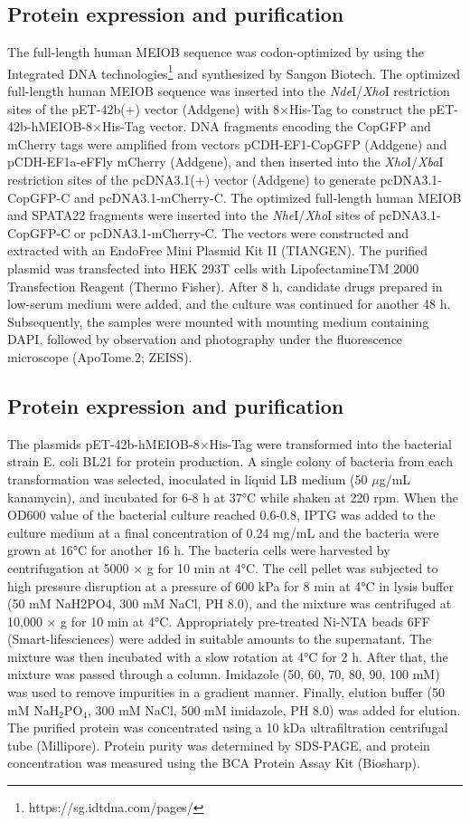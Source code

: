 \documentclass[unnumsec,webpdf,contemporary,large]{oup-authoring-template}%
\theoremstyle{thmstyleone}%
\theoremstyle{thmstyletwo}%
\theoremstyle{thmstylethree}%
\begin{document}
\subsection*{Protein expression and purification}
The full-length human MEIOB sequence was codon-optimized by using the Integrated DNA technologies\footnote{https://sg.idtdna.com/pages/} and synthesized by Sangon Biotech. The optimized full-length human MEIOB sequence was inserted into the \textit{Nde}I/\textit{Xho}I restriction sites of the pET-42b(+) vector (Addgene) with 8×His-Tag to construct the pET-42b-hMEIOB-8×His-Tag vector. DNA fragments encoding the CopGFP and mCherry tags were amplified from vectors pCDH-EF1-CopGFP (Addgene) and pCDH-EF1a-eFFly mCherry (Addgene), and then inserted into the \textit{Xho}I/\textit{Xba}I restriction sites of the pcDNA3.1(+) vector (Addgene) to generate pcDNA3.1-CopGFP-C and pcDNA3.1-mCherry-C. The optimized full-length human MEIOB and SPATA22 fragments were inserted into the \textit{Nhe}I/\textit{Xho}I sites of pcDNA3.1-CopGFP-C or pcDNA3.1-mCherry-C. The vectors were constructed and extracted with an EndoFree Mini Plasmid Kit II (TIANGEN). The purified plasmid was transfected into HEK 293T cells with LipofectamineTM 2000 Transfection Reagent (Thermo Fisher). After 8 h, candidate drugs prepared in low-serum medium were added, and the culture was continued for another 48 h. Subsequently, the samples were mounted with mounting medium containing DAPI, followed by observation and photography under the fluorescence microscope (ApoTome.2; ZEISS).

\subsection*{Protein expression and purification}

The plasmids pET-42b-hMEIOB-8×His-Tag were transformed into the bacterial strain E. coli BL21 for protein production. A single colony of bacteria from each transformation was selected, inoculated in liquid LB medium (50 $\mu$g/mL kanamycin), and incubated for 6-8 h at 37°C while shaken at 220 rpm. When the OD600 value of the bacterial culture reached 0.6-0.8, IPTG was added to the culture medium at a final concentration of 0.24 mg/mL and the bacteria were grown at 16°C for another 16 h. The bacteria cells were harvested by centrifugation at 5000 × g for 10 min at 4°C. The cell pellet was subjected to high pressure disruption at a pressure of 600 kPa for 8 min at 4°C in lysis buffer (50 mM NaH2PO4, 300 mM NaCl, PH 8.0), and the mixture was centrifuged at 10,000 × g for 10 min at 4°C. Appropriately pre-treated Ni-NTA beads 6FF (Smart-lifesciences) were added in suitable amounts to the supernatant. The mixture was then incubated with a slow rotation at 4°C for 2 h. After that, the mixture was passed through a column. Imidazole (50, 60, 70, 80, 90, 100 mM) was used to remove impurities in a gradient manner. Finally, elution buffer (50 mM NaH$_2$PO$_4$, 300 mM NaCl, 500 mM imidazole, PH 8.0) was added for elution. The purified protein was concentrated using a 10 kDa ultrafiltration centrifugal tube (Millipore). Protein purity was determined by SDS-PAGE, and protein concentration was measured using the BCA Protein Assay Kit (Biosharp).
\end{document}
